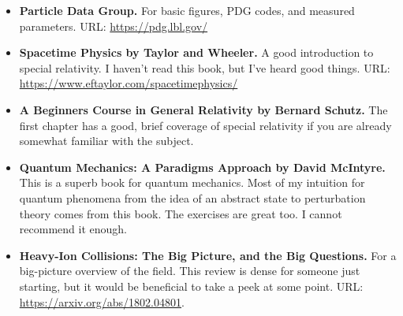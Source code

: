 \documentclass[../main.tex]{subfiles}
\begin{document}
\begin{itemize}
    \item \textbf{Particle Data Group.} For basic figures, PDG codes, and measured parameters. URL: \url{https://pdg.lbl.gov/}
    \item \textbf{Spacetime Physics by Taylor and Wheeler.} A good introduction to special relativity. I haven't read this book, but I've heard good things. URL: \url{https://www.eftaylor.com/spacetimephysics/}
    \item \textbf{A Beginners Course in General Relativity by Bernard Schutz.} The first chapter has a good, brief coverage of special relativity if you are already somewhat familiar with the subject.
    \item \textbf{Quantum Mechanics: A Paradigms Approach by David McIntyre.} This is a superb book for quantum mechanics. Most of my intuition for quantum phenomena from the idea of an abstract state to perturbation theory comes from this book. The exercises are great too. I cannot recommend it enough. 
    \item \textbf{Heavy-Ion Collisions: The Big Picture, and the Big Questions.} For a big-picture overview of the field. This review is dense for someone just starting, but it would be beneficial to take a peek at some point. URL: \url{https://arxiv.org/abs/1802.04801}.
\end{itemize}
\end{document}

